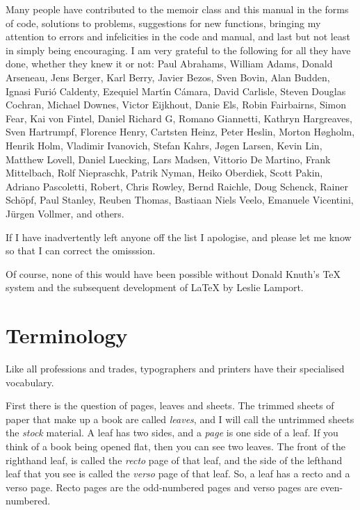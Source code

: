 \documentclass[10pt,letterpaper]{memoir}
\newcommand{\Pclass}[1]{\textsf{#1}}
\newcommand{\Lclass}[1]{\Pclass{#1}%
            \index{#1 class?\Pclass{#1} (class)}%
            \index{class!#1?\Pclass{#1}}}                %
\begin{document}
     Many people have contributed to the \Lclass{memoir} class and this manual
in the forms of code, solutions to problems, suggestions for new functions, 
bringing my attention to errors and infelicities in the code 
and manual, and last but not least in simply being encouraging. 
I am very grateful to the following for all they have done, whether they
knew it or not:
Paul Abrahams,
William Adams,
Donald Arseneau,
Jens Berger,
Karl Berry,
Javier Bezos,
Sven Bovin,
Alan Budden,
Ignasi Furi\'{o} Caldenty,
Ezequiel Mart\'{\i}n C\'{a}mara,
David Carlisle,
Steven Douglas Cochran,
Michael Downes,
Victor Eijkhout,
Danie Els,
Robin Fairbairns,
Simon Fear,
Kai von Fintel,
Daniel Richard G,
Romano Giannetti,
Kathryn Hargreaves,
Sven Hartrumpf,
Florence Henry,
Cartsten Heinz,
Peter Heslin,
Morton H\o{}gholm,
Henrik Holm,
Vladimir Ivanovich,
Stefan Kahrs,
J\o{}gen Larsen,
Kevin Lin,
Matthew Lovell,
Daniel Luecking,
Lars Madsen,
Vittorio De Martino,
Frank Mittelbach,
Rolf Niepraschk,
Patrik Nyman,
Heiko Oberdiek, 
Scott Pakin,
Adriano Pascoletti,
Robert,
Chris Rowley,
Bernd Raichle,
Doug Schenck,
Rainer Sch\"{o}pf,
Paul Stanley,
Reuben Thomas,
Bastiaan Niels Veelo,
Emanuele Vicentini,
J\"{u}rgen Vollmer,
and others.

If I have inadvertently left anyone off the list I apologise, 
and please let me know so that I can correct the omisssion.

    Of course, none of this would have been possible without Donald Knuth's
TeX system and the subsequent development of LaTeX by Leslie Lamport.



\chapter{Terminology}

    Like all professions and trades, typographers and printers have their
specialised vocabulary.

    First there is the question of pages, leaves and sheets. 
The trimmed sheets of paper that make up a book are called 
\emph{leaves},
and I will call the untrimmed sheets the \emph{stock} material. 
A leaf
has two sides, and a \emph{page} is one side of a leaf. 
If you think of a book
being opened flat, then you can see two leaves. The front of the righthand
leaf, is called the \emph{recto} page of that leaf, 
and the side of the
lefthand leaf that you see is called the \emph{verso} page 
of that leaf. 
So, a leaf has a recto and a verso page. Recto pages are the odd-numbered 
pages and verso pages are even-numbered.
\end{document}
